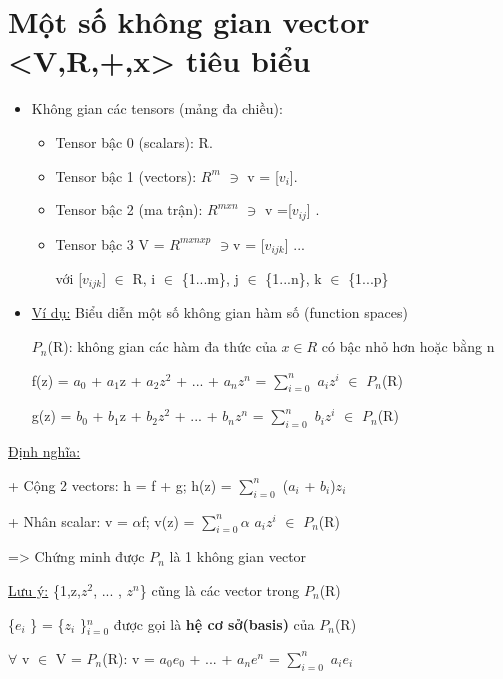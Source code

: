 \documentclass{article}
\begin{document}
\section{Một số không gian vector <V,R,+,x> tiêu biểu}
\begin{itemize}
    \item Không gian các tensors (mảng đa chiều): 
    \begin{itemize}
       \item Tensor bậc 0 (scalars): R.
       \item Tensor bậc 1 (vectors): $R^{m}$  $\ni$ v = [$v_{i}$]. \item Tensor bậc 2 (ma trận): $R^{mxn}$  $\ni$ v =[$v_{ij}$] .
       \item Tensor bậc 3 V = $R^{mxnxp}$  $\ni $v = [$v_{ijk}$] ...
       
với [$v_{ijk}$] $\in$ R, i $\in$ {\{1...m}\}, j $\in$ {\{1...n}\}, k $\in$ {\{1...p}\}
    \end{itemize}
    \item \underline{Ví dụ:} Biểu diễn một số không gian hàm số (function spaces)

$P_{n}$(R): không gian các hàm đa thức của $x \in R$ có bậc nhỏ hơn hoặc bằng n

    f(z) = $a_{0}$ + $a_{1}$z + $a_{2}$$z^{2}$ + ... + $a_{n}$$z^{n}$ = 
         $\sum_{i=0}^{n}$ 
         $a_{i}$$z^{i}$ $\in$ $P_{n}$(R)
         
     g(z) =  $b_{0}$ + $b_{1}$z + $b_{2}$$z^{2}$ + ... + $b_{n}$$z^{n}$ = 
         $\sum_{i=0}^{n}$ 
         $b_{i}$$z^{i}$ $\in$ $P_{n}$(R)
 

\end{itemize}

\underline{Định nghĩa:}

+ Cộng 2 vectors: h = f + g; h(z) = 
$\sum_{i=0}^{n}$ ($a_{i}$ + $b_{i}$)$z_{i}$

+ Nhân scalar: v = $\alpha$f; v(z) = 
$\sum_{i=0}^{n}$$\alpha$
$a_{i}$$z^{i}$ $\in$ $P_{n}$(R)

=> Chứng minh được $P_{n}$ là 1 không gian vector

\underline{Lưu ý:} {\{1,z,$z^{2}$, ... , $z^{n}$}\} cũng là các vector trong $P_{n}$(R)

{\{$e_{i}$} \} = {\{$z_{i}$} \}$_{i=0}^{n}$ 
được gọi là \textbf{hệ cơ sở(basis)} của $P_{n}$(R)

$\forall$ v $\in$ V =  $P_{n}$(R): 
v = $a_{0}$$e_{0}$ + ... + $a_{n}$$e^{n}$ = 
$\sum_{i=0}^{n}$ $a_{i}$$e_{i}$
\end{document}
